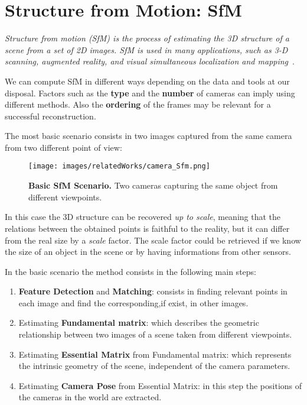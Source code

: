 \section{Structure from Motion: SfM}
\textit{Structure from motion (SfM) is the process of estimating the 3D
structure of a scene from a set of 2D images. SfM is used in many
applications, such as 3-D scanning, augmented reality, and visual
simultaneous localization and mapping}~\cite{sfm_matlab}.

We can compute SfM in different ways depending on the data and tools at our disposal.
Factors such as the \textbf{type} and the \textbf{number} of cameras can imply using different methods. Also 
the \textbf{ordering} of the frames may be relevant for a successful reconstruction.

The most basic scenario consists in two images captured from the same camera from two different point of view:
\begin{figure}[H]
    \centering
    \texttt{[image: images/relatedWorks/camera\_Sfm.png]} 
    \caption{\textbf{Basic SfM Scenario.} Two cameras capturing the same object from different viewpoints.}
    \label{fig:sfm_basic}
\end{figure}
 In this case the 3D structure can be recovered \textit{up to scale}, meaning that the relations between the obtained
 points is faithful to the reality, but it can differ from the real size by a \textit{scale} factor. The scale factor
 could be retrieved if we know the size of an object in the scene or by having informations from other sensors.

 In the basic scenario the method consists in the following main steps:
 \begin{enumerate}
    \item \textbf{Feature Detection} and \textbf{Matching}: consists in finding relevant points in each image and find the corresponding,if exist, in other images.
    \item Estimating \textbf{Fundamental matrix}: which describes the geometric relationship between two images of a scene taken from different viewpoints. 
    \item Estimating \textbf{Essential Matrix} from Fundamental matrix: which represents the intrinsic geometry of the scene, independent of the camera parameters.
    \item Estimating \textbf{Camera Pose} from Essential Matrix: in this step the positions of the cameras in the world are extracted.
 \end{enumerate}

